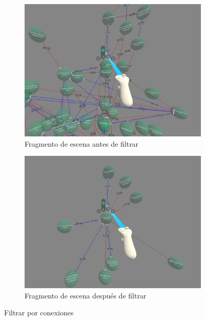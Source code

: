 \begin{figure}[ht]
   \centering
   \begin{subfigure}{0.45\textwidth}
       \centering
       \includegraphics[width=\textwidth]{chapter2/figures/prefilter.png}
       \caption{Fragmento de escena antes de filtrar}
   \end{subfigure}
   \hfill
   \begin{subfigure}{0.45\textwidth}
       \centering
       \includegraphics[width=\textwidth]{chapter2/figures/postfilter.png}
       \caption{Fragmento de escena después de filtrar}
   \end{subfigure}
  \caption{Filtrar por conexiones}
\end{figure}

